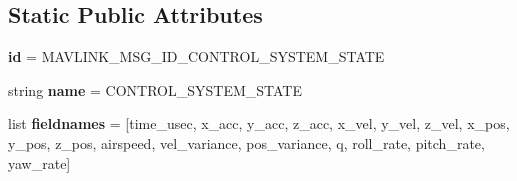 \subsection*{Static Public Attributes}
\begin{DoxyCompactItemize}
\item 
\mbox{\label{classpymavlink_1_1dialects_1_1v10_1_1MAVLink__control__system__state__message_acbded275e20eae205b193c2edde820f2}} 
{\bfseries id} = M\+A\+V\+L\+I\+N\+K\+\_\+\+M\+S\+G\+\_\+\+I\+D\+\_\+\+C\+O\+N\+T\+R\+O\+L\+\_\+\+S\+Y\+S\+T\+E\+M\+\_\+\+S\+T\+A\+TE
\item 
\mbox{\label{classpymavlink_1_1dialects_1_1v10_1_1MAVLink__control__system__state__message_aaba78750835da091bb712128ca463ad1}} 
string {\bfseries name} = \textquotesingle{}C\+O\+N\+T\+R\+O\+L\+\_\+\+S\+Y\+S\+T\+E\+M\+\_\+\+S\+T\+A\+TE\textquotesingle{}
\item 
\mbox{\label{classpymavlink_1_1dialects_1_1v10_1_1MAVLink__control__system__state__message_a06e072b45eb28d6fb70383eb87043e69}} 
list {\bfseries fieldnames} = \mbox{[}\textquotesingle{}time\+\_\+usec\textquotesingle{}, \textquotesingle{}x\+\_\+acc\textquotesingle{}, \textquotesingle{}y\+\_\+acc\textquotesingle{}, \textquotesingle{}z\+\_\+acc\textquotesingle{}, \textquotesingle{}x\+\_\+vel\textquotesingle{}, \textquotesingle{}y\+\_\+vel\textquotesingle{}, \textquotesingle{}z\+\_\+vel\textquotesingle{}, \textquotesingle{}x\+\_\+pos\textquotesingle{}, \textquotesingle{}y\+\_\+pos\textquotesingle{}, \textquotesingle{}z\+\_\+pos\textquotesingle{}, \textquotesingle{}airspeed\textquotesingle{}, \textquotesingle{}vel\+\_\+variance\textquotesingle{}, \textquotesingle{}pos\+\_\+variance\textquotesingle{}, \textquotesingle{}q\textquotesingle{}, \textquotesingle{}roll\+\_\+rate\textquotesingle{}, \textquotesingle{}pitch\+\_\+rate\textquotesingle{}, \textquotesingle{}yaw\+\_\+rate\textquotesingle{}\mbox{]}
\item 
\mbox{\label{classpymavlink_1_1dialects_1_1v10_1_1MAVLink__control__system__state__message_a87efbb087205fa64b04acbe04dec4bee}} 

\end{DoxyCompactItemize}
